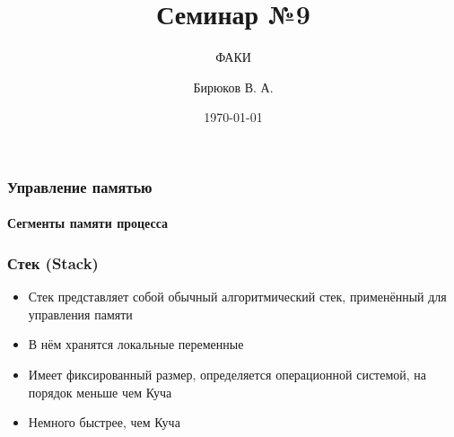 \documentclass[12pt,pdf,hyperref={unicode}]{beamer}
\title{Семинар №9}
\subtitle{ФАКИ \the\year}
\author{Бирюков В. А.}
\date{\today}
\begin{document}
\lstset{language=C}

\begin{frame}
\titlepage
\end{frame} 






\begin{frame}[fragile]
\frametitle{Управление памятью} 
\framesubtitle{Сегменты памяти процесса}
\begin{center}
\end{center}
\end{frame}

\begin{frame}[fragile]
\frametitle{Стек (Stack)} 
\begin{itemize}
\item Стек представляет собой обычный алгоритмический стек, применённый для управления памяти
\item В нём хранятся локальные переменные
\item Имеет фиксированный размер, определяется операционной системой, на порядок меньше чем Куча
\item Немного быстрее, чем Куча
\end{itemize}
\end{frame}
\end{document}
